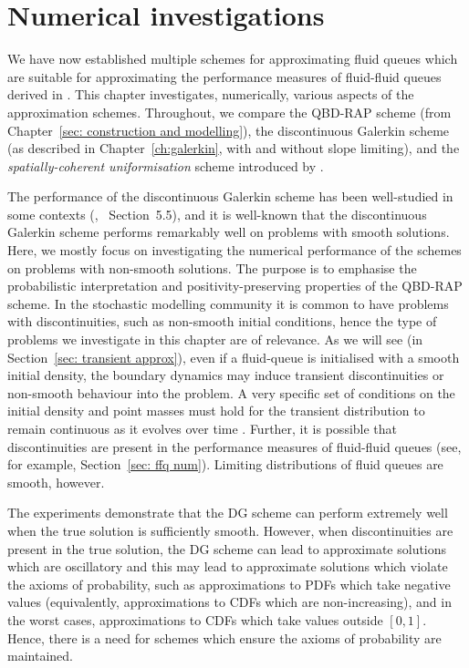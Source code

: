 \chapter{Numerical investigations\label{sec: numerics}}
We have now established multiple schemes for approximating fluid queues which are suitable for approximating the performance measures of fluid-fluid queues derived in \cite{bo2014}. This chapter investigates, numerically, various aspects of the approximation schemes. Throughout, we compare the QBD-RAP scheme (from Chapter~\ref{sec: construction and modelling}), the discontinuous Galerkin scheme (as described in Chapter~\ref{ch:galerkin}, with and without slope limiting), and the \emph{spatially-coherent uniformisation} scheme introduced by \cite{bo2013}. 

The performance of the discontinuous Galerkin scheme has been well-studied in some contexts (\cite{c99}, \cite{nodalDGBook}~Section~5.5), and it is well-known that the discontinuous Galerkin scheme performs remarkably well on problems with smooth solutions. Here, we mostly focus on investigating the numerical performance of the schemes on problems with non-smooth solutions. The purpose is to emphasise the probabilistic interpretation and positivity-preserving properties of the QBD-RAP scheme. In the stochastic modelling community it is common to have problems with discontinuities, such as non-smooth initial conditions, hence the type of problems we investigate in this chapter are of relevance. As we will see (in Section~\ref{sec: transient approx}), even if a fluid-queue is initialised with a smooth initial density, the boundary dynamics may induce transient discontinuities or non-smooth behaviour into the problem. A very specific set of conditions on the initial density and point masses must hold for the transient distribution to remain continuous as it evolves over time \citep{bo2014,bop2020}. Further, it is possible that discontinuities are present in the performance measures of fluid-fluid queues (see, for example, Section~\ref{sec: ffq num}). Limiting distributions of fluid queues are smooth, however.

The experiments demonstrate that the DG scheme can perform extremely well when the true solution is sufficiently smooth. However, when discontinuities are present in the true solution, the DG scheme can lead to approximate solutions which are oscillatory and this may lead to approximate solutions which violate the axioms of probability, such as approximations to PDFs which take negative values (equivalently, approximations to CDFs which are non-increasing), and in the worst cases, approximations to CDFs which take values outside \([0,1]\). Hence, there is a need for schemes which ensure the axioms of probability are maintained. 

